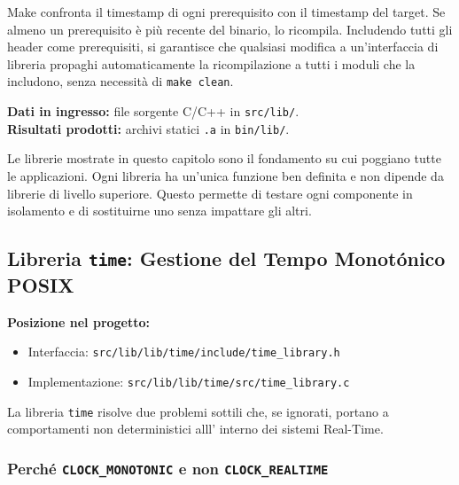 Make confronta il timestamp di ogni prerequisito con il timestamp del target. Se almeno un prerequisito è più recente del binario, lo ricompila. Includendo tutti gli header come prerequisiti, si garantisce che qualsiasi modifica a un'interfaccia di libreria propaghi automaticamente la ricompilazione a tutti i moduli che la includono, senza necessità di \texttt{make clean}.

\label{sec:fase2_librerie}
\label{ch:librerie_core}

\noindent\textbf{Dati in ingresso:} file sorgente C/C++ in \texttt{src/lib/}.\\
\textbf{Risultati prodotti:} archivi statici \texttt{.a} in \texttt{bin/lib/}.

\bigskip

Le librerie mostrate in questo capitolo sono il fondamento su cui poggiano tutte le applicazioni. Ogni libreria ha un'unica funzione ben definita e non dipende da librerie di livello superiore. Questo permette di testare ogni componente in isolamento e di sostituirne uno senza impattare gli altri.

\subsection{Libreria \texttt{time}: Gestione del Tempo Monotónico POSIX}
\label{sec:lib_time}

\noindent\textbf{Posizione nel progetto:}
\begin{itemize}
	\item Interfaccia: \texttt{src/lib/lib/time/include/time\_library.h}
	\item Implementazione: \texttt{src/lib/lib/time/src/time\_library.c}
\end{itemize}

La libreria \texttt{time} risolve due problemi sottili che, se ignorati, portano a comportamenti non deterministici alll' interno dei sistemi Real-Time.

\subsubsection{Perché \texttt{CLOCK\_MONOTONIC} e non \texttt{CLOCK\_REALTIME}}

